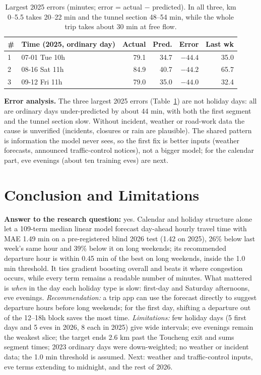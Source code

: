 \documentclass[11pt]{article}
\newcommand{\tb}{\footnotesize}
\begin{document}
\begin{table}[t]\tb\centering\setlength{\tabcolsep}{3pt}
\begin{tabular}{@{}llrrrr@{}}
\toprule \# & Time (2025, ordinary day) & Actual & Pred. & Error & Last wk\\\midrule
1 & 07-01 Tue 10h & 79.1 & 34.7 & $-44.4$ & 35.0\\
2 & 08-16 Sat 11h & 84.9 & 40.7 & $-44.2$ & 65.7\\
3 & 09-12 Fri 11h & 79.0 & 35.0 & $-44.0$ & 32.4\\\bottomrule
\end{tabular}
\caption{Largest 2025 errors (minutes; error = actual $-$ predicted). In all three, km 0--5.5 takes 20--22 min and the tunnel section 48--54 min, while the whole trip takes about 30 min at free flow.}\label{tab:err}
\end{table}
\noindent\textbf{Error analysis.} The three largest 2025 errors (Table~\ref{tab:err}) are not holiday days: all are ordinary days under-predicted by about 44 min, with both the first segment and the tunnel section slow. Without incident, weather or road-work data the cause is unverified (incidents, closures or rain are plausible). The shared pattern is information the model never sees, so the first fix is better inputs (weather forecasts, announced traffic-control notices), not a bigger model; for the calendar part, eve evenings (about ten training eves) are next.

\section{Conclusion and Limitations}
\textbf{Answer to the research question:} yes. Calendar and holiday structure alone let a 109-term median linear model forecast day-ahead hourly travel time with MAE 1.49 min on a pre-registered blind 2026 test (1.42 on 2025), 26\% below last week's same hour and 39\% below it on long weekends; its recommended departure hour is within 0.45 min of the best on long weekends, inside the 1.0 min threshold. It ties gradient boosting overall and beats it where congestion occurs, while every term remains a readable number of minutes. What mattered is \emph{when} in the day each holiday type is slow: first-day and Saturday afternoons, eve evenings. \emph{Recommendation:} a trip app can use the forecast directly to suggest departure hours before long weekends; for the first day, shifting a departure out of the 12--18h block saves the most time.
\emph{Limitations:} few holiday days (5 first days and 5 eves in 2026, 8 each in 2025) give wide intervals; eve evenings remain the weakest slice; the target ends 2.6 km past the Toucheng exit and sums segment times; 2023 ordinary days were down-weighted; no weather or incident data; the 1.0 min threshold is assumed. Next: weather and traffic-control inputs, eve terms extending to midnight, and the rest of 2026.
\end{document}

